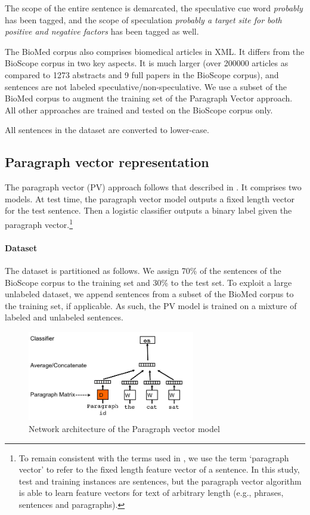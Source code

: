 \documentclass{article}
\begin{document}
The scope of the entire sentence is demarcated, the speculative cue word {\it probably} has been tagged, and the scope of speculation {\it probably a target site for both positive and negative factors} has been tagged as well.

The BioMed corpus also comprises biomedical articles in XML. It differs from the BioScope corpus in two key aspects. It is much larger (over 200000 articles as compared to 1273 abstracts and 9 full papers in the BioScope corpus), and sentences are not labeled speculative/non-speculative. We use a subset of the BioMed corpus to augment the training set of the Paragraph Vector approach. All other approaches are trained and tested on the BioScope corpus only.

All sentences in the dataset are converted to lower-case.
%
%

\subsection{Paragraph vector representation}

The paragraph vector (PV) approach follows that described in \textcite{Le2014}. It comprises two models. At test time, the paragraph vector model outputs a fixed length vector for the test sentence. Then a logistic classifier outputs a binary label given the paragraph vector.\footnote{To remain consistent with the terms used in \textcite{Le2014}, we use the term `paragraph vector' to refer to the fixed length feature vector of a sentence. In this study, test and training instances are sentences, but the paragraph vector algorithm is able to learn feature vectors for text of arbitrary length (e.g., phrases, sentences and paragraphs).}

\paragraph{Dataset} The dataset is partitioned as follows. We assign 70\% of the sentences of the BioScope corpus to the training set and 30\% to the test set. To exploit a large unlabeled dataset, we append sentences from a subset of the BioMed corpus to the training set, if applicable. As such, the PV model is trained on a mixture of labeled and unlabeled sentences.

\begin{figure}
\centering
    \includegraphics[width=0.65\textwidth]{PVexample.PNG}
\caption{Network architecture of the Paragraph vector model \autocite{Le2014}}
\label{fig:PV}
\end{figure}
\end{document}
